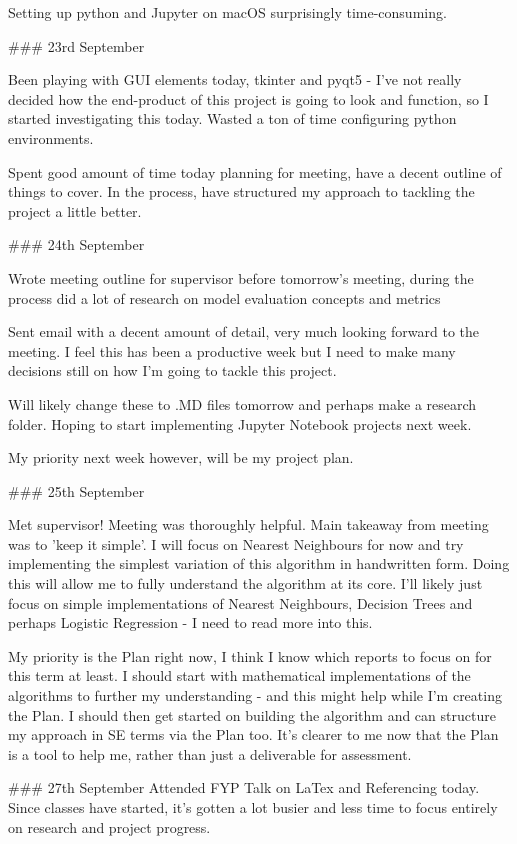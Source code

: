 \documentclass[letterpaper,10pt]{article}
\begin{document}
\begin{markdown}
Setting up python and Jupyter on macOS surprisingly time-consuming.

### 23rd September

Been playing with GUI elements today, tkinter and pyqt5 - I've not really decided how the end-product of this project is going to look and function, so I started investigating this today.
Wasted a ton of time configuring python environments.

Spent good amount of time today planning for meeting, have a decent outline of things to cover. In the process, have structured my approach to tackling the project a little better.

### 24th September

Wrote meeting outline for supervisor before tomorrow's meeting, during the process did a lot of research on model evaluation concepts and metrics

Sent email with a decent amount of detail, very much looking forward to the meeting. I feel this has been a productive week but I need to make many decisions still on how I'm going to tackle this project.

Will likely change these to .MD files tomorrow and perhaps make a research folder. Hoping to start implementing Jupyter Notebook projects next week.

My priority next week however, will be my project plan. 

### 25th September

Met supervisor! Meeting was thoroughly helpful. Main takeaway from meeting was to 'keep it simple'. I will focus on Nearest Neighbours for now and try implementing the simplest variation of this algorithm in handwritten form. Doing this will allow me to fully understand the algorithm at its core.
I'll likely just focus on simple implementations of Nearest Neighbours, Decision Trees and perhaps Logistic Regression - I need to read more into this.

My priority is the Plan right now, I think I know which reports to focus on for this term at least. I should start with mathematical implementations of the algorithms to further my understanding - and this might help while I'm creating the Plan. I should then get started on building the algorithm and can structure my approach in SE terms via the Plan too. It's clearer to me now that the Plan is a tool to help me, rather than just a deliverable for assessment.

### 27th September
Attended FYP Talk on LaTex and Referencing today. Since classes have started, it's gotten a lot busier and less time to focus entirely on research and project progress.


\end{markdown}
\end{document}
